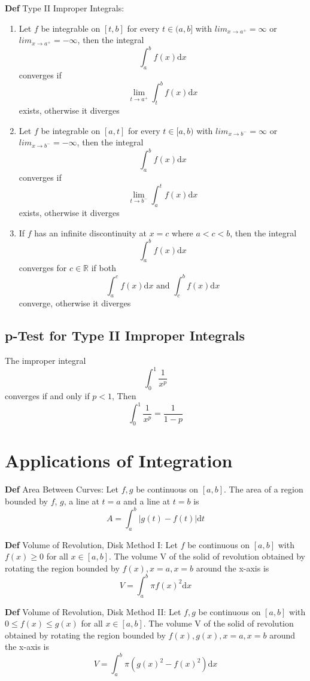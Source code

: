 \documentclass[11pt,notitlepage]{report}
\begin{document}
\newpage
\textbf{Def} Type II Improper Integrals: 
\begin{enumerate}
    \item Let $f$ be integrable on $[t, b]$ for every $t \in (a, b]$ with $lim_{x\rightarrow a^+} = \infty$ or $lim_{x\rightarrow a^+} = -\infty$, then the integral
    $$\int_a^b f(x) \mathrm{d}x$$ converges if $$\lim_{t \rightarrow a^+} \int_t^b f(x) \mathrm{d}x$$ exists,
    otherwise it diverges
    \item Let $f$ be integrable on $[a, t]$ for every $t \in [a, b)$ with $lim_{x\rightarrow b^-} = \infty$ or $lim_{x\rightarrow b^-} = -\infty$, then the integral
    $$\int_a^b f(x) \mathrm{d}x$$ converges if $$\lim_{t \rightarrow b^-} \int_a^t f(x) \mathrm{d}x$$ exists,
    otherwise it diverges
    \item If $f$ has an infinite discontinuity at $x = c$ where $a < c < b$, then the integral
    $$\int_{a}^b f(x) \mathrm{d}x$$ converges for $c \in \mathbb R$ if both $$\int_a^c f(x) \mathrm{d}x \text{ and } \int_c^b f(x) \mathrm{d}x$$
    converge, otherwise it diverges
\end{enumerate}

\section{p-Test for Type II Improper Integrals}The improper integral $$\int_0^1 \frac{1}{x^p}$$ converges if and only if $p < 1$, Then $$\int_0^1 \frac{1}{x^p} = \frac{1}{1-p}$$

\newpage
\chapter{Applications of Integration}

\textbf{Def} Area Between Curves: Let $f, g$ be continuous on $[a, b]$. The area of a region bounded by $f$, $g$, a line at $t=a$ and a line at $t=b$ is
$$A = \int_a^b |g(t)-f(t)|\mathrm{d}t$$

\textbf{Def} Volume of Revolution, Disk Method I: Let $f$ be continuous on $[a, b]$ with $f(x) \geq 0$ for all $x \in [a, b]$. The volume V of the solid of revolution obtained by rotating the region bounded by $f(x), x=a, x=b$ around the x-axis is
$$V = \int_a^b \pi f(x)^2\mathrm{d}x$$

\textbf{Def} Volume of Revolution, Disk Method II: Let $f, g$ be continuous on $[a, b]$ with $0 \leq f(x) \leq g(x)$ for all $x \in [a, b]$. The volume V of the solid of revolution obtained by rotating the region bounded by $f(x), g(x), x=a, x=b$ around the x-axis is
$$V = \int_a^b \pi (g(x)^2-f(x)^2)\mathrm{d}x$$
\end{document}
